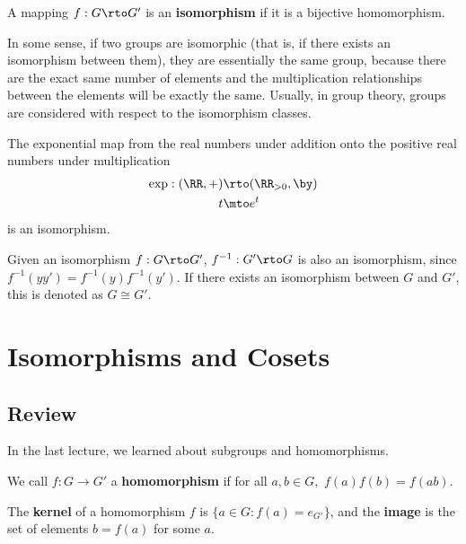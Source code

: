\begin{definition}
A mapping $f: G \rto G'$ is an \textbf{isomorphism} if it is a bijective homomorphism.
\end{definition}
In some sense, if two groups are isomorphic (that is, if there exists an isomorphism between them), they are essentially the same group, because there are the exact same number of elements and the multiplication relationships between the elements will be exactly the same. Usually, in group theory, groups are considered with respect to the isomorphism classes. 
\begin{example}
The exponential map from the real numbers under addition onto the positive real numbers under multiplication \begin{align*}
    \text{exp}: (\RR, +) &\rto (\RR_{>0}, \by) \\
    t &\mto e^t
\end{align*} is an isomorphism.
\end{example}

Given an isomorphism $f: G \rto G'$, $f^{-1}: G' \rto G$ is also an isomorphism, since $f^{-1}(yy') = f^{-1}(y)f^{-1}(y')$. If there exists an isomorphism between $G$ and $G'$, this is denoted as $G \cong G'$. 

\newpage


\section{Isomorphisms and Cosets}

\subsection{Review}
In the last lecture, we learned about subgroups and homomorphisms.  

\begin{definition}
We call $f: G \rightarrow G'$ a \textbf{homomorphism} if for all $a, b \in G,$ $f(a)f(b) = f(ab).$ 
\end{definition}
\begin{definition}
The \textbf{kernel} of a homomorphism $f$ is $\{a \in G : f(a) = e_{G'}\}$, and the \textbf{image} is the set of elements $b = f(a)$ for some $a.$
\end{definition}

